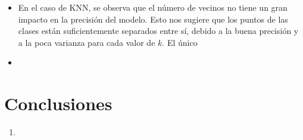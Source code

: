 \documentclass[conference]{IEEEtran}
\begin{document}
\begin{itemize}
\item En el caso de KNN, se observa que el número de vecinos no tiene un gran impacto en la precisión del modelo. Esto nos sugiere que los puntos de las clases están suficientemente separados entre sí, debido a la buena precisión y a la poca varianza para cada valor de $k$. El único 

\item 
\end{itemize}

\section{Conclusiones}

\begin{enumerate}
\item 
\end{enumerate}
\end{document}
